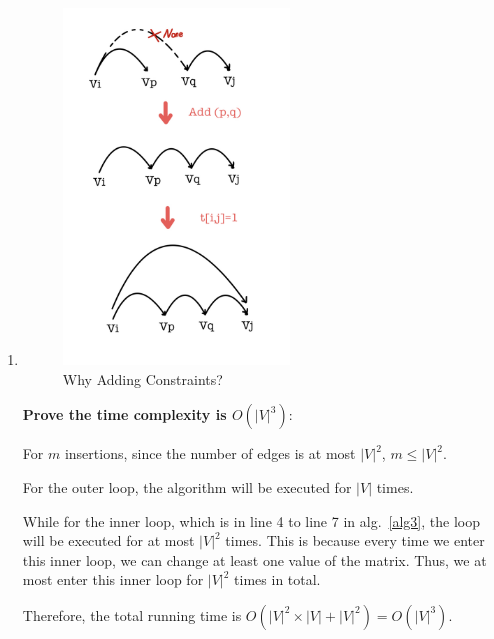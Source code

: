 \documentclass[12pt,a4paper]{article}
\makeatletter
\newtheorem*{solution}{Solution}
\theoremstyle{definition}
\renewenvironment{solution}[1][Solution] {\par\pushQED{\qed}\normalfont\topsep6\p@\@plus6\p@\relax\trivlist\item[\hskip\labelsep\bfseries#1\@addpunct{.}]\ignorespaces}{\popQED\endtrivlist\@endpefalse} \makeatother
\makeatother
\begin{document}
\begin{enumerate}
\begin{enumerate}
\begin{solution}
	     \begin{figure}[htbp]
	        \centering
	        \includegraphics[width=6cm]{2.jpg}
	        \caption{Why Adding Constraints?}
	        \label{clousre}
	    \end{figure}
	    
	    
	   \textbf{Prove the time complexity is $O(|V|^3)$}:
	   
	   For $m$ insertions, since the number of edges is at most $|V|^2$, $m\leq |V|^2$.
	   
	   For the outer loop, the algorithm will be executed for $|V|$ times.
	   
	   While for the inner loop, which is in line 4 to line 7 in alg.~\ref{alg3}, the loop will be executed for at most $|V|^2$ times. This is because every time we enter this inner loop, we can change at least one value of the matrix. Thus, we at most enter this inner loop for $|V|^2$ times in total.
	   
	   Therefore, the total running time is $O(|V|^2\times |V| + |V|^2)=O(|V|^3)$.
	   
	   
	    \end{solution}
	\end{enumerate}

	
	

\end{enumerate}
\end{document}
